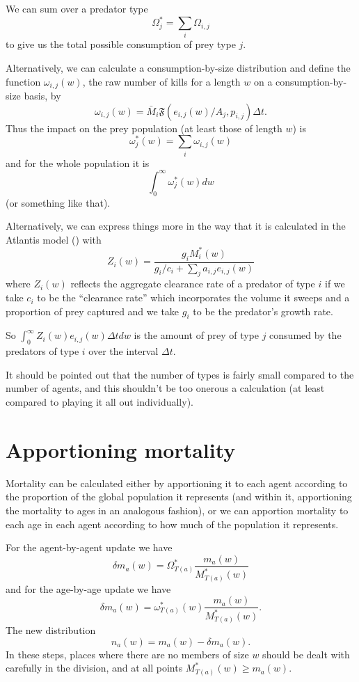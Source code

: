 We can sum over a predator type
\[ \Omega_j^{\ast} = \sum_i \Omega_{i,j} \]
to give us the total possible consumption of prey type $j$.

Alternatively, we can calculate a consumption-by-size distribution and define
the function $\omega_{i,j} (w)$, the raw number of kills for a length $w$ on a
consumption-by-size basis, by
\[ \omega_{i,j} (w) = \bar{M}_i \mathfrak{F} (e_{i,j} (w) / A_j, p_{i,j})
   \Delta t. \]
Thus the impact on the prey population (at least those of length $w$) is
\[ \omega_j^{\ast} (w) = \sum_i \omega_{i,j} (w) \]
and for the whole population it is
\[ \int_0^{\infty} \omega^{\ast}_j (w) d w \]
(or something like that).

Alternatively, we can express things more in the way that it is
calculated in the Atlantis model (\cite{Fulton2011pcomm}) with
\[ Z_i (w) = \frac{g_i M^{\ast}_i (w)}{g_i / c_i + \sum_j a_{i,j} e_{i,j} (w)}
\]
where $Z_i (w)$ reflects the aggregate clearance rate of a predator of type
$i$ if we take $c_i$ to be the ``clearance rate'' which incorporates the
volume it sweeps and a proportion of prey captured and we take $g_i$ to be the
predator's growth rate.

So $\int_0^{\infty} Z_i (w) e_{i,j} (w) \Delta t d w$ is the amount of prey of
type $j$ consumed by the predators of type $i$ over the interval $\Delta t$.



It should be pointed out that the number of types is fairly small compared to
the number of agents, and this shouldn't be too onerous a calculation (at
least compared to playing it all out individually).

\section{Apportioning mortality}

Mortality can be calculated either by apportioning it to each agent according
to the proportion of the global population it represents (and within it,
apportioning the mortality to ages in an analogous fashion), or we can
apportion mortality to each age in each agent according to how much of the
population it represents.

For the agent-by-agent update we have
\[ \delta m_a (w) = \Omega^{\ast}_{T (a)}  \frac{m_a (w)}{M^{\ast}_{T (a)}
   (w)} \]
and for the age-by-age update we have
\[ \delta m_a (w) = \omega^{\ast}_{T (a)} (w)  \frac{m_a (w)}{M^{\ast}_{T (a)}
   (w)} . \]
The new distribution
\[ n_a (w) = m_a (w) - \delta m_a (w) . \]
In these steps, places where there are no members of size $w$ should be dealt
with carefully in the division, and at all points $M^{\ast}_{T (a)} (w)
\geqslant m_a (w)$.
